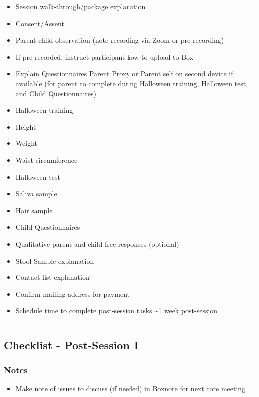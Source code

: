 \documentclass[]{book}
\providecommand{\tightlist}{%
  \setlength{\itemsep}{0pt}\setlength{\parskip}{0pt}}
\begin{document}
\begin{itemize}
\tightlist
\item
  Session walk-through/package explanation
\item
  Consent/Assent
\item
  Parent-child observation (note recording via Zoom or pre-recording)
\item
  If pre-recorded, instruct participant how to upload to Box
\item
  Explain Questionnaires Parent Proxy or Parent self on second device if available (for parent to complete during Halloween training, Halloween test, and Child Questionnaires)
\item
  Halloween training
\item
  Height
\item
  Weight
\item
  Waist circumference
\item
  Halloween test
\item
  Saliva sample
\item
  Hair sample
\item
  Child Questionnaires
\item
  Qualitative parent and child free responses (optional)
\item
  Stool Sample explanation
\item
  Contact list explanation
\item
  Confirm mailing address for payment
\item
  Schedule time to complete post-session tasks \textasciitilde{}1 week post-session
\end{itemize}

\begin{center}\rule{0.5\linewidth}{0.5pt}\end{center}

\hypertarget{checklist---post-session-1}{%
\subsection{Checklist - Post-Session 1}\label{checklist---post-session-1}}

\hypertarget{notes}{%
\subsubsection{Notes}\label{notes}}

\begin{itemize}
\tightlist
\item
  Make note of issues to discuss (if needed) in Boxnote for next core meeting
\end{itemize}
\end{document}
